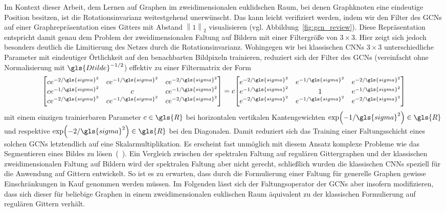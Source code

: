Im Kontext dieser Arbeit, dem Lernen auf Graphen im zweidimensionalen euklidschen Raum, bei denen Graphknoten eine eindeutige Position besitzen, ist die Rotationsinvarianz weitestgehend unerwünscht.
Das kann leicht verifiziert werden, indem wir den Filter des \glspl{GCN} auf einer Graphrepräsentation eines Gitters mit Abstand $\left\|1\right\|_2$ visualisieren (vgl. Abbildung~\ref{fig:gcn_review}).
Diese Repräsentation entspricht damit genau dem Problem der zweidimensionalen Faltung auf Bildern mit einer Filtergröße von $3 \times 3$.
Hier zeigt sich jedoch besonders deutlich die Limitierung des Netzes durch die Rotationsinvarianz.
Wohingegen wir bei klassischen \glspl{CNN} $3 \times 3$ unterschiedliche Parameter mit eindeutiger Örtlichkeit auf den benachbarten Bildpixeln trainieren, reduziert sich der Filter des \glspl{GCN} (vereinfacht ohne Normalisierung mit $\gls{Dtilde}^{-1/2}$) effektiv zu einer Filtermatrix der Form
\begin{equation*}
  \begin{bmatrix}
    ce^{-2/\gls{sigma}^2} & ce^{-1/\gls{sigma}^2} & ce^{-2/\gls{sigma}^2}\\
    ce^{-1/\gls{sigma}^2} & c & ce^{-1/\gls{sigma}^2}\\
    ce^{-2/\gls{sigma}^2} & ce^{-1/\gls{sigma}^2} & ce^{-2/\gls{sigma}^2}
  \end{bmatrix} = c \begin{bmatrix}
    e^{-2/\gls{sigma}^2} & e^{-1/\gls{sigma}^2} & e^{-2/\gls{sigma}^2}\\
    e^{-1/\gls{sigma}^2} & 1 & e^{-1/\gls{sigma}^2}\\
    e^{-2/\gls{sigma}^2} & e^{-1/\gls{sigma}^2} & e^{-2/\gls{sigma}^2}
  \end{bmatrix}
\end{equation*}
mit einem einzigen trainierbaren Parameter $c \in \gls{R}$ bei horizontalen \bzw{} vertikalen Kantengewichten $\exp\left(-1/\gls{sigma}^2\right) \in \gls{R}$ und respektive $\exp\left(-2/\gls{sigma}^2\right) \in \gls{R}$ bei den Diagonalen.
Damit reduziert sich das Training einer Faltungsschicht eines solchen \glspl{GCN} letztendlich auf eine Skalarmultiplikation.
Es erscheint fast unmöglich mit diesem Ansatz komplexe Probleme wie \zB{} das Segmentieren eines Bildes zu lösen~(\vgl{}~\cite{gcn_review}).
Ein Vergleich zwischen der spektralen Faltung auf regulären Gittergraphen und der klassischen zweidimensionalen Faltung auf Bildern wird der spektralen Faltung aber nicht gerecht, schließlich wurden die klassischen \glspl{CNN} speziell für die Anwendung auf Gittern entwickelt.
So ist es zu erwarten, dass durch die Formulierung einer Faltung für generelle Graphen gewisse Einschränkungen in Kauf genommen werden müssen.
Im Folgenden lässt sich der Faltungsoperator der \glspl{GCN} aber insofern modifizieren, dass sich dieser für beliebige Graphen in einem zweidimensionalen euklischen Raum äquivalent zu der klassischen Formulierung auf regulären Gittern verhält.

